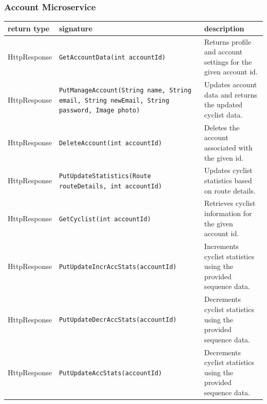 \subsubsection{Account Microservice}
\begin{table}[H]
\centering
\small
\begin{tabularx}{\textwidth}{|L{3cm}|L{6.5cm}|Y|}
\hline
\textbf{return type} & \textbf{signature} & \textbf{description} \\
\hline
HttpResponse & \texttt{GetAccountData(int accountId)} & Returns profile and account settings for the given account id. \\
\hline
HttpResponse & \texttt{PutManageAccount(String name, String  email, String newEmail, String password, Image photo)} & Updates account data and returns the updated cyclist data. \\
\hline
HttpResponse & \texttt{DeleteAccount(int accountId)} & Deletes the account associated with the given id. \\
\hline
HttpResponse & \texttt{PutUpdateStatistics(Route routeDetails, int accountId)} & Updates cyclist statistics based on route details. \\
\hline
HttpResponse & \texttt{GetCyclist(int accountId)} & Retrieves cyclist information for the given account id. \\
\hline
HttpResponse & \texttt{PutUpdateIncrAccStats(accountId)} & Increments cyclist statistics using the provided sequence data. \\
\hline
HttpResponse & \texttt{PutUpdateDecrAccStats(accountId)} & Decrements cyclist statistics using the provided sequence data. \\
\hline
HttpResponse & \texttt{PutUpdateAccStats(accountId)} & Decrements cyclist statistics using the provided sequence data. \\
\hline
\end{tabularx}
\end{table}
\newpage
